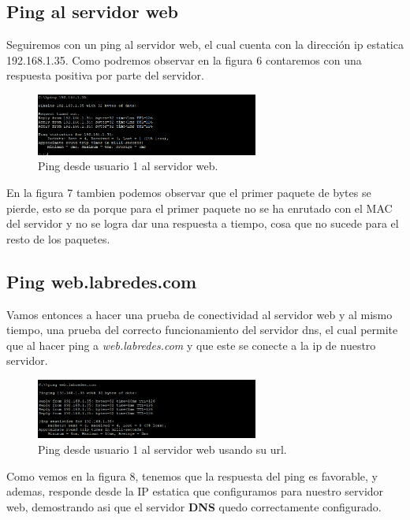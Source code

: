 \documentclass[10pt]{article}
\begin{document}
\subsection{Ping al servidor web}
Seguiremos con un ping al servidor web, el cual cuenta con la dirección ip estatica 192.168.1.35. Como podremos observar en la figura 6 contaremos con una respuesta positiva por parte del servidor.
\begin{figure}[H]
    \centering
    \includegraphics[width=0.65\textwidth]{lab-01-screenshots/43-2-ping-web.png}
    \caption{Ping desde usuario 1 al servidor web.}
\end{figure}
En la figura 7 tambien podemos observar que el primer paquete de bytes se pierde, esto se da porque para el primer paquete no se ha enrutado con el MAC del servidor y no se logra dar una respuesta a tiempo, cosa que no sucede para el resto de los paquetes.
\subsection{Ping web.labredes.com}
Vamos entonces a hacer una prueba de conectividad al servidor web y al mismo tiempo, una prueba del correcto funcionamiento del servidor dns, el cual permite que al hacer ping a \textit {web.labredes.com} y que este se conecte a la ip de nuestro servidor. 
\begin{figure}[H]
    \centering
    \includegraphics[width=0.65\textwidth]{lab-01-screenshots/43-3-ping-web.png}
    \caption{Ping desde usuario 1 al servidor web usando su url.}
\end{figure}
Como vemos en la figura 8, tenemos que la respuesta del ping es favorable, y ademas, responde desde la IP estatica que configuramos para nuestro servidor web, demostrando asi que el servidor \textbf {DNS} quedo correctamente configurado.
\end{document}
